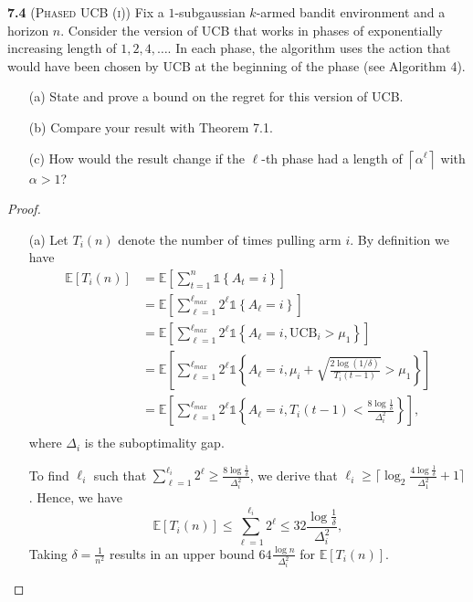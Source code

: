 \begin{enumerate}[(a)]
\noindent\textbf{7.4} (\textsc{Phased UCB (i)})
Fix a $1$-subgaussian $k$-armed bandit environment and a horizon $n$.
Consider the version of UCB that works in phases of exponentially increasing length of $1,2,4, \ldots$.
In each phase, the algorithm uses the action that would have been chosen by UCB at the beginning of the phase (see Algorithm 4).

\begin{enumerate}
    \item[(a)] State and prove a bound on the regret for this version of UCB.
    \item[(b)] Compare your result with Theorem 7.1.
    \item[(c)] How would the result change if the $\ell$-th phase had a length of $\left\lceil\alpha^{\ell}\right\rceil$ with $\alpha > 1$?
\end{enumerate}

\begin{proof}
    \begin{enumerate}
        \item[(a)] Let $T_{i}(n)$ denote the number of times pulling arm $i$.
        By definition we have
        $$
        \begin{aligned}
            \mathbb{E}\left[T_{i}(n)\right]
            &=\mathbb{E}\left[ \sum_{t=1}^{n} \mathbb{1}\left\{A_{t}=i\right\}\right]\\
            &=\mathbb{E}\left[ \sum_{\ell=1}^{\ell_{max}} 2^\ell \mathbb{1}\left\{A_{\ell}=i\right\}\right]\\
            &=\mathbb{E}\left[ \sum_{\ell=1}^{\ell_{max}} 2^\ell \mathbb{1}\left\{A_{\ell}=i, \mathrm{UCB}_{i} > \mu_1\right\}\right]\\
            &=\mathbb{E}\left[ \sum_{\ell=1}^{\ell_{max}} 2^\ell \mathbb{1}\left\{A_{\ell}=i, \mu_{i} + \sqrt{\frac{2 \log (1 / \delta)}{T_{i}(t-1)}} > \mu_1\right\}\right]\\
            &=\mathbb{E}\left[ \sum_{\ell=1}^{\ell_{max}} 2^\ell \mathbb{1}\left\{A_{\ell}=i, T_{i}(t-1) < \frac{8 \log \frac{1}{\delta}}{\Delta_{i}^{2}} \right\}\right],\\
        \end{aligned}
        $$
        where $\Delta_i$ is the suboptimality gap.

        To find $\ell_i$ such that $\sum_{\ell=1}^{\ell_{i}} 2^{\ell} \geq \frac{8 \log \frac{1}{\delta}}{\Delta_{i}^{2}}$, we derive that $\ell_i \geq \lceil \log _{2} \frac{4 \log \frac{1}{\delta}}{\Delta_{1}^{2}}+1 \rceil$.
        Hence, we have
        $$
            \mathbb{E}\left[T_{i}(n)\right] \leq \sum_{\ell = 1}^{\ell_i} 2^\ell \leq 32 \frac{\log \frac{1}{\delta}}{\Delta_i^2},
        $$
        Taking $\delta = \frac{1}{n^2}$ results in an upper bound $64\frac{\log n}{\Delta_{i}^{2}}$ for $\mathbb{E}\left[T_{i}(n)\right]$.
    

\end{enumerate}
\end{proof}
\end{enumerate}
